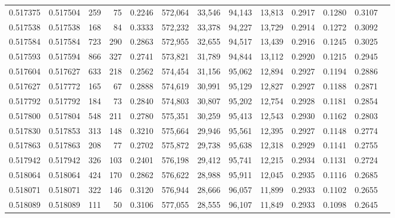 \begin{tabular}{rrrrrrrrrrrrr}
0.517375 & 0.517504 &   259 &    75 &                                     0.2246 & 572,064 &  33,546 &  94,143 &  13,813 & 0.2917 & 0.1280 & 0.3107 \\
0.517538 & 0.517538 &   168 &    84 &                                     0.3333 & 572,232 &  33,378 &  94,227 &  13,729 & 0.2914 & 0.1272 & 0.3092 \\
0.517584 & 0.517584 &   723 &   290 &                                     0.2863 & 572,955 &  32,655 &  94,517 &  13,439 & 0.2916 & 0.1245 & 0.3025 \\
0.517593 & 0.517594 &   866 &   327 &                                     0.2741 & 573,821 &  31,789 &  94,844 &  13,112 & 0.2920 & 0.1215 & 0.2945 \\
0.517604 & 0.517627 &   633 &   218 &                                     0.2562 & 574,454 &  31,156 &  95,062 &  12,894 & 0.2927 & 0.1194 & 0.2886 \\
0.517627 & 0.517772 &   165 &    67 &                                     0.2888 & 574,619 &  30,991 &  95,129 &  12,827 & 0.2927 & 0.1188 & 0.2871 \\
0.517792 & 0.517792 &   184 &    73 &                                     0.2840 & 574,803 &  30,807 &  95,202 &  12,754 & 0.2928 & 0.1181 & 0.2854 \\
0.517800 & 0.517804 &   548 &   211 &                                     0.2780 & 575,351 &  30,259 &  95,413 &  12,543 & 0.2930 & 0.1162 & 0.2803 \\
0.517830 & 0.517853 &   313 &   148 &                                     0.3210 & 575,664 &  29,946 &  95,561 &  12,395 & 0.2927 & 0.1148 & 0.2774 \\
0.517863 & 0.517863 &   208 &    77 &                                     0.2702 & 575,872 &  29,738 &  95,638 &  12,318 & 0.2929 & 0.1141 & 0.2755 \\
0.517942 & 0.517942 &   326 &   103 &                                     0.2401 & 576,198 &  29,412 &  95,741 &  12,215 & 0.2934 & 0.1131 & 0.2724 \\
0.518064 & 0.518064 &   424 &   170 &                                     0.2862 & 576,622 &  28,988 &  95,911 &  12,045 & 0.2935 & 0.1116 & 0.2685 \\
0.518071 & 0.518071 &   322 &   146 &                                     0.3120 & 576,944 &  28,666 &  96,057 &  11,899 & 0.2933 & 0.1102 & 0.2655 \\
0.518089 & 0.518089 &   111 &    50 &                                     0.3106 & 577,055 &  28,555 &  96,107 &  11,849 & 0.2933 & 0.1098 & 0.2645 \\

\end{tabular}
